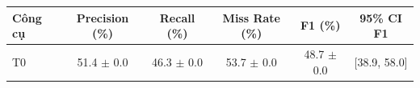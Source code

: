 \begin{tabular}{lccccc}
\toprule
Công cụ & Precision (\%) & Recall (\%) & Miss Rate (\%) & F1 (\%) & 95\% CI F1 \\
\midrule
T0 & 51.4 $\pm$ 0.0 & 46.3 $\pm$ 0.0 & 53.7 $\pm$ 0.0 & 48.7 $\pm$ 0.0 & [38.9, 58.0] \\
\bottomrule
\end{tabular}
